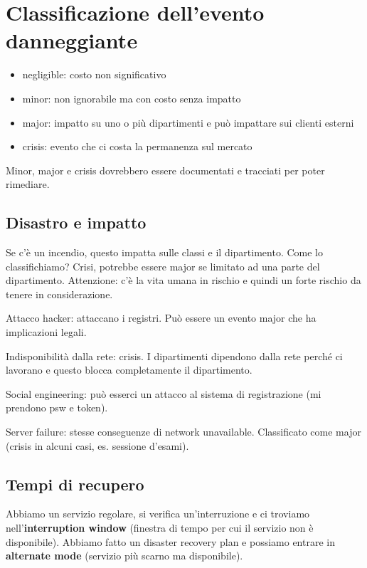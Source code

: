 \section{Classificazione dell'evento danneggiante}

\begin{itemize}
\item negligible: costo non significativo
\item minor: non ignorabile ma con costo senza impatto
\item major: impatto su uno o più dipartimenti e può impattare sui clienti 
esterni
\item crisis: evento che ci costa la permanenza sul mercato
\end{itemize}

Minor, major e crisis dovrebbero essere documentati e tracciati per poter 
rimediare.

\subsection{Disastro e impatto}


Se c'è un incendio, questo impatta sulle classi e il dipartimento. Come lo 
classifichiamo? Crisi, potrebbe essere major se limitato ad una parte del 
dipartimento. Attenzione: c'è la vita umana in rischio e quindi un forte rischio 
da tenere in considerazione.

Attacco hacker: attaccano i registri. Può essere un evento major che ha 
implicazioni legali.

Indisponibilità dalla rete: crisis. I dipartimenti dipendono dalla rete perché 
ci lavorano e questo blocca completamente il dipartimento.

Social engineering: può esserci un attacco al sistema di registrazione (mi 
prendono psw e token).

Server failure: stesse conseguenze di network unavailable. Classificato come 
major (crisis in alcuni casi, es. sessione d'esami).

\subsection{Tempi di recupero}

Abbiamo un servizio regolare, si verifica un'interruzione e ci troviamo 
nell'\textbf{interruption window} (finestra di tempo per cui il servizio non è 
disponibile). Abbiamo fatto un disaster recovery plan e possiamo entrare in 
\textbf{alternate mode} (servizio più scarno ma disponibile).

